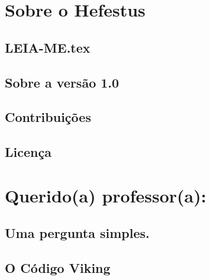 \color{black}

	\chapter{\sffamily Sobre o Hefestus}
	
\section{\sffamily LEIA-ME.tex}



\section{\sffamily Sobre a vers\~{a}o 1.0}


\section{\sffamily Contribui\c{c}\~{o}es}


\section{\sffamily Licen\c{c}a}


		\chapter{\sffamily Querido(a) professor(a):}

%		




\section{\sffamily Uma pergunta simples.}



\section{\sffamily O C\'{o}digo Viking}



